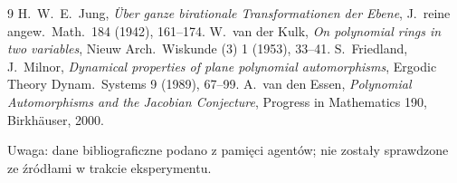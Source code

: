 \begin{thebibliography}{9}
 H.~W.~E.~Jung, \emph{Über ganze birationale Transformationen der Ebene},
  J.\ reine angew.\ Math.\ 184 (1942), 161--174.
 W.~van der Kulk, \emph{On polynomial rings in two variables},
  Nieuw Arch.\ Wiskunde (3) 1 (1953), 33--41.
 S.~Friedland, J.~Milnor, \emph{Dynamical properties of plane polynomial
  automorphisms}, Ergodic Theory Dynam.\ Systems 9 (1989), 67--99.
 A.~van den Essen, \emph{Polynomial Automorphisms and the Jacobian Conjecture},
  Progress in Mathematics 190, Birkhäuser, 2000.
\end{thebibliography}
\noindent\small Uwaga: dane bibliograficzne podano z pamięci agentów; nie zostały sprawdzone ze
źródłami w trakcie eksperymentu.
